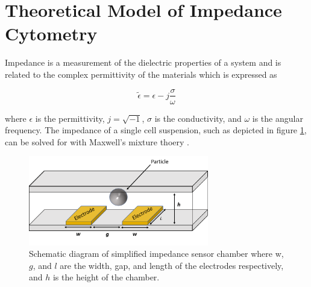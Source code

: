  
 \section[Model of Cell Suspension Impedance]{Theoretical Model of Impedance Cytometry}
 \par Impedance is a measurement of the dielectric properties of a system and is related to the complex permittivity of the materials which is expressed as

\begin{equation}
    \tilde{\epsilon} = \epsilon - j\frac{\sigma}{\omega}
\end{equation}

\noindent where $\epsilon$ is the permittivity, $j = \sqrt{-1}$, $\sigma$ is the conductivity, and $\omega$ is the angular frequency. The impedance of a single cell suspension, such as depicted in figure \ref{fig:simplified_IS}, can be solved for with Maxwell's mixture thoery \cite{james_clerk_maxwell_treatise_1892, sun_single-cell_2010}.

\begin{figure}[ht]
 \centering
 \includegraphics[width=0.7\textwidth]{images/cellAndElectrodes.png}
 \caption[Schematic diagram of simplified impedance sensor chamber.]{Schematic diagram of simplified impedance sensor chamber where w, $g$, and $l$ are the width, gap, and length of the electrodes respectively, and $h$ is the height of the chamber.}
 \label{fig:simplified_IS}
 \end{figure}
 
 


